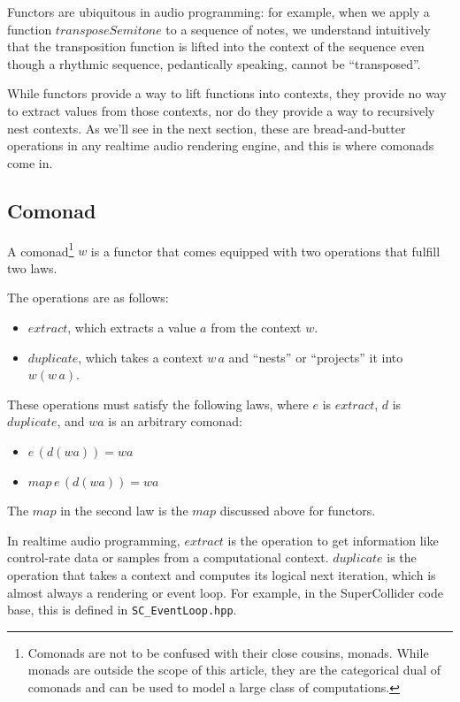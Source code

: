 \documentclass{article}
\begin{document}
Functors are ubiquitous in audio programming: for example, when we apply a function $transposeSemitone$ to a sequence of notes, we understand intuitively that the transposition function is lifted into the context of the sequence even though a rhythmic sequence, pedantically speaking, cannot be ``transposed''.

While functors provide a way to lift functions into contexts, they provide no way to extract values from those contexts, nor do they provide a way to recursively nest contexts. As we'll see in the next section, these are bread-and-butter operations in any realtime audio rendering engine, and this is where comonads come in.

\subsection{Comonad}

A comonad\footnote{Comonads are not to be confused with their close cousins, monads. While monads are outside the scope of this article, they are the categorical dual of comonads and can be used to model a large class of computations.} $w$ is a functor that comes equipped with two operations that fulfill two laws.

The operations are as follows:

\begin{itemize}
  \item $extract$, which extracts a value $a$ from the context $w$.
  \item $duplicate$, which takes a context $w\,a$ and ``nests'' or ``projects'' it into $w(w\,a)$.
\end{itemize}

These operations must satisfy the following laws, where $e$ is $extract$, $d$ is $duplicate$, and $wa$ is an arbitrary comonad:

\begin{itemize}
  \item $e\,(d (wa)) = wa$
  \item $map\,e\,(d (wa)) = wa$
\end{itemize}

The $map$ in the second law is the $map$ discussed above for functors.

In realtime audio programming, $extract$ is the operation to get information like control-rate data or samples from a computational context. $duplicate$ is the operation that takes a context and computes its logical next iteration, which is almost always a rendering or event loop. For example, in the SuperCollider code base, this is defined in \texttt{SC\_EventLoop.hpp}.
\end{document}
